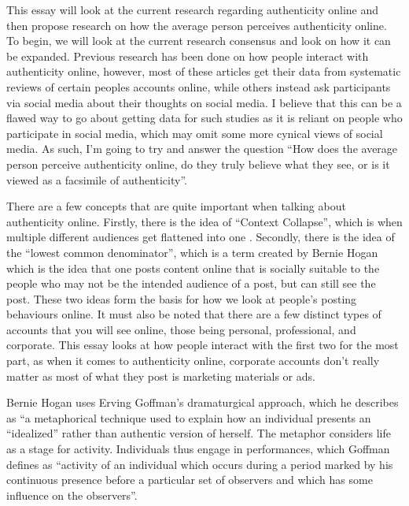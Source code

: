 \documentclass[12pt]{article}
\begin{document}
\begin{doublespace}
\vspace*{20pt}

\par This essay will look at the current research regarding authenticity online and then propose research on how the average person perceives authenticity online. 
    To begin, we will look at the current research consensus and look on how it can be expanded.  
    Previous research has been done on how people interact with authenticity online, however, most of these articles get their data from systematic reviews of certain peoples accounts online, 
    while others instead ask participants via social media about their thoughts on social media. 
    I believe that this can be a flawed way to go about getting data for such studies as it is reliant on people who participate in social media, which may omit some more cynical views of social media. 
    As such, I'm going to try and answer the question ``How does the average person perceive authenticity online, do they truly believe what they see, or is it viewed as a facsimile of authenticity''. 
\par There are a few concepts that are quite important when talking about authenticity online. 
    Firstly, there is the idea of ``Context Collapse'', which is when multiple different audiences get flattened into one \autocite[122]{MB1}.
    Secondly, there is the idea of the ``lowest common denominator'', which is a term created by Bernie Hogan which is the idea that one posts content online that is socially suitable to the people who may not be the intended audience of a post, but can still see the post. \Autocite*[383]{Hogan1}
    These two ideas form the basis for how we look at people's posting behaviours online. It must also be noted that there are a few distinct types of accounts that you will see online, those being personal, professional, and corporate. This essay looks at how people interact with the first two for the most part, as when it comes to authenticity online, corporate accounts don't really matter as most of what they post is marketing materials or ads.
\par Bernie Hogan uses Erving Goffman's dramaturgical approach, which he describes as ``a metaphorical technique used to explain how an individual presents an ``idealized'' rather than authentic version of herself. The metaphor considers life as a stage for activity. Individuals thus engage in performances, which Goffman defines as ``activity of an individual which occurs during a period marked by his continuous presence before a particular set of observers and which has some influence on the observers''\autocite[22]{Goffman}. 

\end{doublespace}
\end{document}

